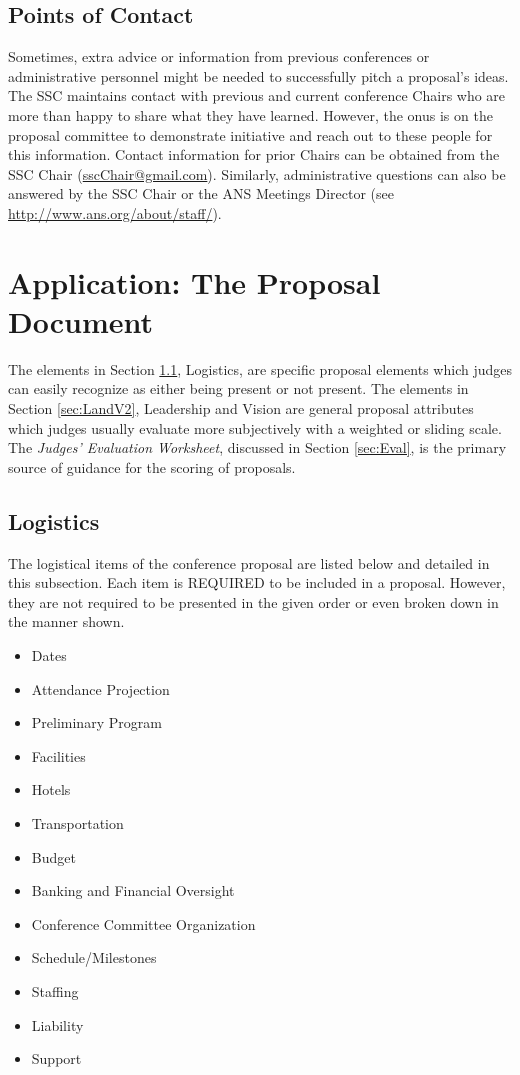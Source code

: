 \documentclass[12pt]{article}
\begin{document}
\subsection{Points of Contact}\label{sec:points_of_contact}
Sometimes, extra advice or information from previous conferences or administrative personnel might be needed to successfully pitch a proposal's ideas. The SSC maintains contact with previous and current conference Chairs who are more than happy to share what they have learned.
However, the onus is on the proposal committee to demonstrate initiative and reach out to these people for this information.
Contact information for prior Chairs can be obtained from the SSC Chair (\href{mailto:sscChair@gmail.com}{sscChair@gmail.com}).
Similarly, administrative questions can also be answered by the SSC Chair or the ANS Meetings Director (see \href{http://www.ans.org/about/staff/}{http://www.ans.org/about/staff/}).

\clearpage
\section{Application: The Proposal Document} \label{sec:TheProposal}
The elements in Section \ref{sec:Logistics}, Logistics, are specific proposal
elements which judges can easily recognize as either being present or not present. The
elements in Section \ref{sec:LandV2}, Leadership and Vision  are general proposal
attributes which judges usually evaluate more subjectively with a weighted or sliding
scale. 
The \textit{Judges’ Evaluation Worksheet}, discussed in Section \ref{sec:Eval}, is the primary source of
guidance for the scoring of proposals.

\subsection{Logistics} \label{sec:Logistics}
The logistical items of the conference proposal are listed below and detailed in this
subsection. Each item is REQUIRED to be included in a proposal. However, they
are not required to be presented in the given order or even broken down in the manner
shown.

\begin{itemize}
\item{Dates}
\item{Attendance Projection}
\item{Preliminary Program}
\item{Facilities}
\item{Hotels}
\item{Transportation}
\item{Budget}
\item{Banking and Financial Oversight}
\item{Conference Committee Organization}
\item{Schedule/Milestones}
\item{Staffing}
\item{Liability}
\item{Support}
\end{itemize}
\end{document}
